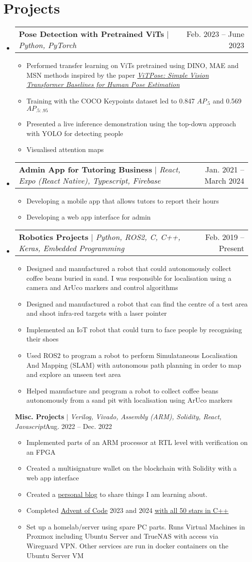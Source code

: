 \documentclass[letterpaper,11pt]{article}
\makeatletter
\newcommand{\resumeItem}[1]{
  \item\small{
    {#1 \vspace{-2pt}}
  }
}
\newcommand{\resumeProjectHeading}[2]{
  \item
  \begin{tabular*}{0.97\textwidth}{l@{\extracolsep{\fill}}r}
    \small#1 & #2 \\
  \end{tabular*}\vspace{-7pt}
}
\newcommand{\resumeSubHeadingListStart}{\begin{itemize}[leftmargin=0.15in, label={}]}
\newcommand{\resumeSubHeadingListEnd}{\end{itemize}}
\newcommand{\resumeItemListStart}{\begin{itemize}}
\newcommand{\resumeItemListEnd}{\end{itemize}\vspace{-5pt}}
\makeatother
\begin{document}
\section{Projects}
\resumeSubHeadingListStart
\resumeProjectHeading
{\textbf{Pose Detection with Pretrained ViTs} $|$ \emph{Python, PyTorch}}{Feb. 2023 -- June 2023}
\resumeItemListStart
\resumeItem{Performed transfer learning on ViTs pretrained using DINO, MAE and MSN methods inspired by the paper \href{https://doi.org/10.48550/arXiv.2204.12484}{\ul{\textit{ViTPose: Simple Vision Transformer Baselines for Human Pose Estimation}}}}
\resumeItem{Training with the COCO Keypoints dataset led to 0.847 $AP_{.5}$
  and 0.569 $AP_{.5:.95}$}
\resumeItem{Presented a live inference demonstration using the top-down approach with YOLO
  for detecting people}
\resumeItem{Visualised attention maps}
\resumeItemListEnd
\resumeProjectHeading
{\textbf{Admin App for Tutoring Business} $|$ \emph{React, Expo (React Native), Typescript, Firebase}}{Jan. 2021 -- March 2024}
\resumeItemListStart
\resumeItem{Developing a mobile app that allows tutors to report their hours}
\resumeItem{Developing a web app interface for admin}
\resumeItemListEnd
\resumeProjectHeading
{\textbf{Robotics Projects} $|$ \emph{Python, ROS2, C, C++, Keras, Embedded Programming}}{Feb. 2019 -- Present}
\resumeItemListStart
\resumeItem{Designed and manufactured a robot that could autonomously collect coffee beans
  buried in sand. I was responsible for localisation using a camera and ArUco
  markers and control algorithms}
\resumeItem{Designed and manufactured a robot that can find the centre of a test area and
  shoot infra-red targets with a laser pointer}
\resumeItem{Implemented an IoT robot that could turn to face people by recognising their
  shoes}
\resumeItem{Used ROS2 to program a robot to perform Simulataneous Localisation And Mapping
  (SLAM) with autonomous path planning in order to map and explore an unseen test
  area}
\resumeItem{Helped manufacture and program a robot to collect coffee beans autonomously
  from a sand pit with localisation using ArUco markers}
\resumeItemListEnd
{\textbf{Misc. Projects} $|$ \emph{Verilog, Vivado, Assembly (ARM), Solidity, React, Javascript}}{Aug. 2022 -- Dec. 2022}
\resumeItemListStart
\resumeItem{Implemented parts of an ARM processor at RTL level with verification on an FPGA}
\resumeItem{Created a multisignature wallet on the blockchain with Solidity with a web app
  interface}
\resumeItem{Created a \href{https://tariqsoliman.com/}{\ul{personal blog}} to share things I am learning about.}
\resumeItem{Completed \href{https://adventofcode.com/}{\ul{Advent of Code}} 2023 and 2024 \href{https://github.com/TSoli/advent-of-code}{\ul{with all 50 stars in C++}}}
\resumeItem{Set up a homelab/server using spare PC parts. Runs Virtual Machines in Proxmox
  including Ubuntu Server and TrueNAS with access via Wireguard VPN. Other
  services are run in docker containers on the Ubuntu Server VM}
\resumeItemListEnd
\resumeSubHeadingListEnd
\end{document}
